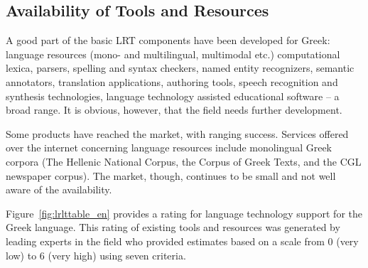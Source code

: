 \documentclass[]{../../metanetpaper}
\begin{document}
\begin{multicols}{2}
\subsection{Availability of Tools and Resources}

A good part of the basic LRT components have been developed for Greek: language resources (mono- and multilingual, multimodal etc.) computational lexica, parsers, spelling and syntax checkers, named entity recognizers, semantic annotators, translation applications, authoring tools, speech recognition and synthesis technologies, language technology assisted educational software -- a broad range. It is obvious, however, that the field needs further development.

Some products have reached the market, with ranging success. Services offered over the internet concerning language resources include monolingual Greek corpora (The Hellenic National Corpus, the Corpus of Greek Texts, and the CGL newspaper corpus). The market, though, continues to be small and not well aware of the availability.

Figure~\ref{fig:lrlttable_en} provides a rating for language technology support for the Greek language. This rating of existing tools and resources was generated by leading experts in the field who provided estimates based on a scale from 0 (very low) to 6 (very high) using seven criteria.


\end{multicols}
\end{document}
